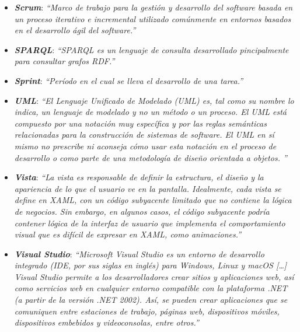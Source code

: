 \begin{itemize}
    \item \textbf{\textit{Scrum}}: \textit{“Marco de trabajo para la gestión y 
    desarrollo del software basada en un proceso iterativo e incremental 
    utilizado comúnmente en entornos basados en el desarrollo ágil del
    software.”} \autocite*{AlonsoAlvarezGarciaRafaeldelasHerasdelDedo2012}

    \item \textbf{\textit{SPARQL}}: \textit{“SPARQL es un lenguaje de consulta desarrollado pincipalmente para consultar
    grafos RDF.”} \autocite*{Sirin2007}

    \item \textbf{\textit{Sprint}}: \textit{“Período en el cual se lleva el desarrollo de una tarea.”} \autocite*{AlonsoAlvarezGarciaRafaeldelasHerasdelDedo2012}

    \item \textbf{\textit{UML}}: \textit{“El Lenguaje Unificado de Modelado (UML) es, tal como su nombre lo indica, un lenguaje de
    modelado y no un método o un proceso. El UML está compuesto por una notación muy específica y por las reglas semánticas relacionadas 
    para la construcción de sistemas de software. El UML en sí mismo no prescribe ni aconseja cómo usar esta notación en el proceso 
    de desarrollo o como parte de una metodología de diseño orientada a objetos. ”} \autocite*{Sparks2008}

    \item \textbf{\textit{Vista}}: \textit{“La vista es responsable de definir 
    la estructura, el diseño y la apariencia de lo que el usuario ve 
    en la pantalla. Idealmente, cada vista se define en XAML, con un 
    código subyacente limitado que no contiene la lógica de negocios. 
    Sin embargo, en algunos casos, el código subyacente podría contener 
    lógica de la interfaz de usuario que implementa el comportamiento 
    visual que es difícil de expresar en XAML, como animaciones.”}  \autocite*{MicrosoftMVVM}

    \item \textbf{\textit{Visual Studio}}: \textit{“Microsoft Visual Studio es un entorno de desarrollo integrado 
    (IDE, por sus siglas en inglés) para Windows, Linux y macOS [\dots] Visual Studio permite a los desarrolladores 
    crear sitios y aplicaciones web, así como servicios web en cualquier entorno compatible con la plataforma .NET 
    (a partir de la versión .NET 2002). Así, se pueden crear aplicaciones que se comuniquen entre estaciones de trabajo, 
    páginas web, dispositivos móviles, dispositivos embebidos y videoconsolas, entre otros.”} \autocite*{VisualStudio}


\end{itemize}

